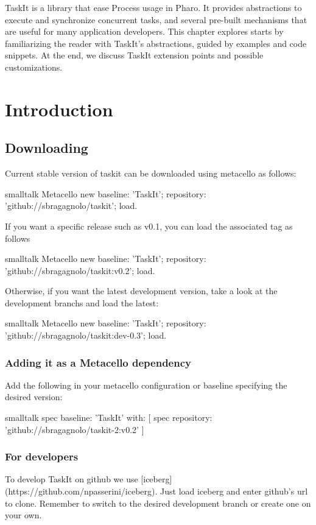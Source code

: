 \documentclass[10pt,twoside,english]{_support/latex/sbabook/sbabook}
\begin{document}
TaskIt is a library that ease Process usage in Pharo. It provides abstractions to execute and synchronize concurrent tasks, and several pre-built mechanisms that are useful for many application developers. This chapter explores starts by familiarizing the reader with TaskIt's abstractions, guided by examples and code snippets. At the end, we discuss TaskIt extension points and possible customizations.
\chapter{Introduction}\section{Downloading}
Current stable version of taskit can be downloaded using metacello as follows:

\begin{displaycode}{smalltalk}
Metacello new
  baseline: 'TaskIt';
  repository: 'github://sbragagnolo/taskit';
  load.
\end{displaycode}

If you want a specific release such as v0.1, you can load the associated tag as follows

\begin{displaycode}{smalltalk}
Metacello new
  baseline: 'TaskIt';
  repository: 'github://sbragagnolo/taskit:v0.2';
  load.
\end{displaycode}

Otherwise, if you want the latest development version, take a look at the development branchs and load the latest:

\begin{displaycode}{smalltalk}
Metacello new
  baseline: 'TaskIt';
  repository: 'github://sbragagnolo/taskit:dev-0.3';
  load.
\end{displaycode}
\subsection{Adding it as a Metacello dependency}
Add the following in your metacello configuration or baseline specifying the desired version:

\begin{displaycode}{smalltalk}
spec
    baseline: 'TaskIt'
    with: [ spec repository: 'github://sbragagnolo/taskit-2:v0.2' ]
\end{displaycode}
\subsection{For developers}
To develop TaskIt on github we use {[}iceberg{]}(https://github.com/npasserini/iceberg). Just load iceberg and enter github's url to clone. Remember to switch to the desired development branch or create one on your own.
\end{document}
